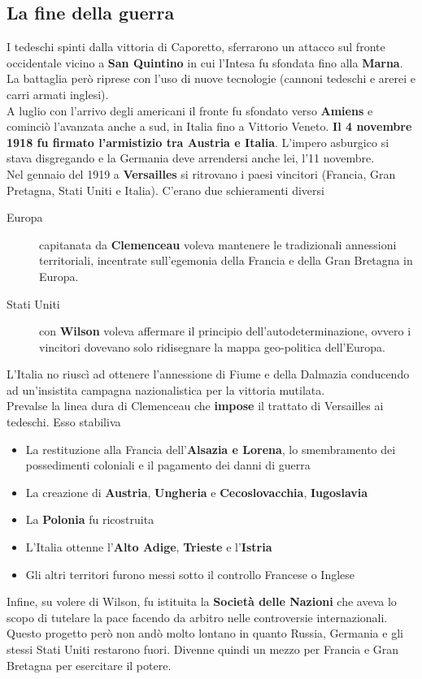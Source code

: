 \subsection{La fine della guerra}
I tedeschi spinti dalla vittoria di Caporetto, sferrarono un attacco sul fronte occidentale vicino a
\textbf{San Quintino} in cui l'Intesa fu sfondata fino alla \textbf{Marna}. La battaglia però
riprese con l'uso di nuove tecnologie (cannoni tedeschi e arerei e carri armati inglesi).\\
A luglio con l'arrivo degli americani il fronte fu sfondato verso \textbf{Amiens} e cominciò 
l'avanzata anche a sud, in Italia fino a Vittorio Veneto. \textbf{Il 4 novembre 1918 fu firmato
l'armistizio tra Austria e Italia}. L'impero asburgico si stava disgregando e la Germania deve
arrendersi anche lei, l'11 novembre.\\ [\baselineskip]
Nel gennaio del 1919 a \textbf{Versailles} si ritrovano i paesi vincitori (Francia, Gran Pretagna,
Stati Uniti e Italia). C'erano due schieramenti diversi
\begin{description}
  \item[Europa] capitanata da \textbf{Clemenceau} voleva mantenere le tradizionali annessioni
    territoriali, incentrate sull'egemonia della Francia e della Gran Bretagna in Europa.
  \item[Stati Uniti] con \textbf{Wilson} voleva affermare il principio dell'autodeterminazione,
    ovvero i vincitori dovevano solo ridisegnare la mappa geo-politica dell'Europa.
\end{description}
L'Italia no riuscì ad ottenere l'annessione di Fiume e della Dalmazia conducendo ad un'insistita
campagna nazionalistica per la vittoria mutilata.\\ [\baselineskip]
Prevalse la linea dura di Clemenceau che \textbf{impose} il trattato di Versailles ai tedeschi.
Esso stabiliva
\begin{itemize}
  \item La restituzione alla Francia dell'\textbf{Alsazia e Lorena}, lo smembramento dei possedimenti
    coloniali e il pagamento dei danni di guerra
  \item La creazione di \textbf{Austria}, \textbf{Ungheria} e \textbf{Cecoslovacchia}, 
    \textbf{Iugoslavia}
  \item La \textbf{Polonia} fu ricostruita
  \item L'Italia ottenne l'\textbf{Alto Adige}, \textbf{Trieste} e l'\textbf{Istria} 
  \item Gli altri territori furono messi sotto il controllo Francese o Inglese
\end{itemize}
Infine, su volere di Wilson, fu istituita la \textbf{Società delle Nazioni} che aveva lo scopo di 
tutelare la pace facendo da arbitro nelle controversie internazionali. Questo progetto però
non andò molto lontano in quanto Russia, Germania e gli stessi Stati Uniti restarono fuori. Divenne
quindi un mezzo per Francia e Gran Bretagna per esercitare il potere.
